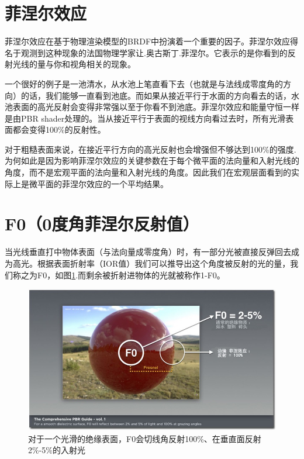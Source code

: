 \section{菲涅尔效应}

菲涅尔效应在基于物理渲染模型的BRDF中扮演着一个重要的因子。菲涅尔效应得名于观测到这种现象的法国物理学家让.奥古斯丁.菲涅尔。它表示的是你看到的反射光线的量与你和视角相关的现象。

一个很好的例子是一池清水，从水池上笔直看下去（也就是与法线成零度角的方向）的话，我们能够一直看到池底。而如果从接近平行于水面的方向看去的话，水池表面的高光反射会变得非常强以至于你看不到池底。菲涅尔效应和能量守恒一样是由PBR shader处理的。当从接近平行于表面的视线方向看过去时，所有光滑表面都会变得100\%的反射性。

对于粗糙表面来说，在接近平行方向的高光反射也会增强但不够达到100\%的强度.为何如此是因为影响菲涅尔效应的关键参数在于每个微平面的法向量和入射光线的角度，而不是宏观平面的法向量和入射光线的角度。因此我们在宏观层面看到的实际上是微平面的菲涅尔效应的一个平均结果。

\section{F0（0度角菲涅尔反射值）}

当光线垂直打中物体表面（与法向量成零度角）时，有一部分光被直接反弹回去成为高光。根据表面折射率（IOR值）我们可以推导出这个角度被反射的光的量，我们称之为F0，如图\ref{fig:chap1_9}.而剩余被折射进物体的光就被称作1-F0。

\begin{figure}[ht]
    \centering
	\includegraphics[width=\textwidth]{images/chap1_9.jpg}
	\caption{对于一个光滑的绝缘表面，F0会切线角反射100\%、在垂直面反射2\%-5\%的入射光}
    \label{fig:chap1_9}
\end{figure}

